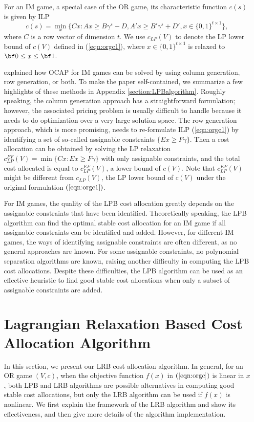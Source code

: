 \documentclass[ijoc,nonblindrev]{informs3} %
\begin{document}
For an IM game, a special case of the OR game, its characteristic function $c(s)$ is given by ILP
\begin{equation}\label{eqn:orgc1}
c(s) = \min_{x} \big\{ Cx:Ax \geq B\gamma^s + D, A'x \geq B'\gamma^s + D', x \in \{0,1\}^{t \times 1} \big\},
\end{equation}
where $C$ is a row vector of dimension $t$.  We use $c_{LP}(V)$ to denote the LP lower bound of $c(V)$ defined in (\ref{eqn:orgc1}), where $x \in \{0,1\}^{t \times 1}$ is relaxed to ${\bf 0}\leq x \leq {\bf 1}$.


\cite{Caprara2010LPB} explained how OCAP for IM games can be solved by using column generation, row generation, or both. To make the paper self-contained, we  summarize a few highlights of these methods in Appendix \ref{section:LPBalgorithm}.
Roughly speaking, the column generation approach has  a straightforward formulation; however, the associated pricing problem is usually difficult to handle because it needs to do optimization over a very large solution  space. The row generation approach, which is more promising, needs to re-formulate ILP (\ref{eqn:orgc1}) by identifying a set of so-called assignable constraints $\{ Ex \geq F\gamma\}$. Then a cost allocation can be obtained by solving the LP relaxation $c_{LP}^{EF}(V)=\min\{ Cx : Ex \geq F\gamma\}$ with only assignable constraints, and the total cost allocated is equal to  $c_{LP}^{EF}(V)$,  a lower bound of $c(V)$. Note that  $c_{LP}^{EF}(V)$ might be different from $c_{LP}(V)$, the LP lower bound of $c(V)$ under the original formulation $(\ref{eqn:orgc1})$.


For IM games, the quality of the LPB cost allocation greatly depends on the assignable constraints that have been identified.
Theoretically speaking, the LPB algorithm can find the optimal stable cost allocation for an IM game if all assignable constraints can be identified and added. 
However, for different IM games, the ways of identifying assignable constraints are often different, as no general approaches are known.
For some assignable constraints, no polynomial separation algorithms are known, raising another difficulty in computing the LPB cost allocations.
Despite these difficulties, the LPB algorithm can be used as an effective heuristic to find good stable cost allocations when only a subset of assignable constraints are added.



\section{Lagrangian Relaxation Based Cost Allocation Algorithm} \label{section:lrbmethod}
 In this section, we present our LRB cost allocation algorithm. In general, for an OR game $(V,c)$, when the objective function $f(x)$ in $(\ref{eqn:orgc})$ is linear in $x$, both LPB and LRB algorithms are possible alternatives in computing good stable cost allocations, but only the LRB algorithm can be used if $f(x)$ is nonlinear.
We first explain the framework of the LRB algorithm and show its effectiveness, and then give more details of the algorithm implementation.
 
\end{document}
